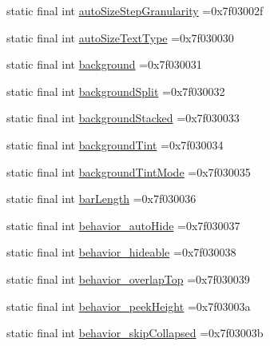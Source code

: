\begin{DoxyCompactItemize}
\item 
static final int \mbox{\hyperlink{classbr_1_1unb_1_1cic_1_1mp_1_1marketmaster_1_1R_1_1attr_a4740faa51a63e3ec68bb9196b68be379}{auto\+Size\+Step\+Granularity}} =0x7f03002f
\item 
static final int \mbox{\hyperlink{classbr_1_1unb_1_1cic_1_1mp_1_1marketmaster_1_1R_1_1attr_ad5b5b91e7cc84ce8f5057578878f2c02}{auto\+Size\+Text\+Type}} =0x7f030030
\item 
static final int \mbox{\hyperlink{classbr_1_1unb_1_1cic_1_1mp_1_1marketmaster_1_1R_1_1attr_a8d362a1faf87028d4786170d2dd29744}{background}} =0x7f030031
\item 
static final int \mbox{\hyperlink{classbr_1_1unb_1_1cic_1_1mp_1_1marketmaster_1_1R_1_1attr_a180997e04663d3612a5e5d0d63b7db7f}{background\+Split}} =0x7f030032
\item 
static final int \mbox{\hyperlink{classbr_1_1unb_1_1cic_1_1mp_1_1marketmaster_1_1R_1_1attr_a6ec7a24ee49256c60b7aab5971b8a71b}{background\+Stacked}} =0x7f030033
\item 
static final int \mbox{\hyperlink{classbr_1_1unb_1_1cic_1_1mp_1_1marketmaster_1_1R_1_1attr_ad32b32af176d8df3a73f5f45b01f6c4f}{background\+Tint}} =0x7f030034
\item 
static final int \mbox{\hyperlink{classbr_1_1unb_1_1cic_1_1mp_1_1marketmaster_1_1R_1_1attr_ac30d51b2a0153235091b68ba15d6c436}{background\+Tint\+Mode}} =0x7f030035
\item 
static final int \mbox{\hyperlink{classbr_1_1unb_1_1cic_1_1mp_1_1marketmaster_1_1R_1_1attr_aa129952a7c4901f33d19129bcff06fea}{bar\+Length}} =0x7f030036
\item 
static final int \mbox{\hyperlink{classbr_1_1unb_1_1cic_1_1mp_1_1marketmaster_1_1R_1_1attr_a6eb03e7ddf05d1da3d1d9167426a1c5e}{behavior\+\_\+auto\+Hide}} =0x7f030037
\item 
static final int \mbox{\hyperlink{classbr_1_1unb_1_1cic_1_1mp_1_1marketmaster_1_1R_1_1attr_ac658ffe52d62657e91f4976cafad4e5d}{behavior\+\_\+hideable}} =0x7f030038
\item 
static final int \mbox{\hyperlink{classbr_1_1unb_1_1cic_1_1mp_1_1marketmaster_1_1R_1_1attr_a050d77fd023d1567a53d031d098bd8aa}{behavior\+\_\+overlap\+Top}} =0x7f030039
\item 
static final int \mbox{\hyperlink{classbr_1_1unb_1_1cic_1_1mp_1_1marketmaster_1_1R_1_1attr_ae63110dc65741b58829c6ad9062ef06d}{behavior\+\_\+peek\+Height}} =0x7f03003a
\item 
static final int \mbox{\hyperlink{classbr_1_1unb_1_1cic_1_1mp_1_1marketmaster_1_1R_1_1attr_a7065315b5d09a30236a28c3a78b14cf7}{behavior\+\_\+skip\+Collapsed}} =0x7f03003b

\end{DoxyCompactItemize}

